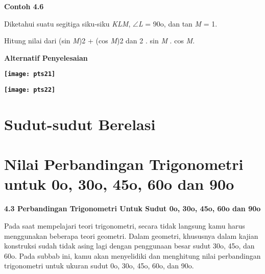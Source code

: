\documentclass[11pt,fleqn]{book} %
\begin{document}
\noindent \textbf{Contoh 4.6}

\noindent \textbf{}

\noindent Diketahui suatu segitiga siku-siku \textit{KLM}, $\mathrm{\angle}$\textit{L }= 90o, dan tan \textit{M }= 1.

\noindent 

\noindent Hitung nilai dari (sin \textit{M})2 + (cos \textit{M})2 dan 2 . sin \textit{M }. cos \textit{M}.

\noindent 

\noindent 

\noindent 

\noindent 

\noindent 

\noindent 

\noindent \textbf{Alternatif Penyelesaian}

\noindent \textbf{}

\noindent \textbf{\texttt{[image: pts21]}}

\noindent \textbf{\texttt{[image: pts22]}}

\noindent \textbf{}
\section{Sudut-sudut Berelasi}

\section{Nilai Perbandingan Trigonometri untuk 0o, 30o, 45o, 60o dan 90o}



\noindent \textbf{4.3 Perbandingan Trigonometri Untuk Sudut 0o, 30o, 45o, 60o dan 90o}

\noindent 

Pada saat mempelajari teori trigonometri, secara tidak langsung kamu harus menggunakan beberapa teori geometri. Dalam geometri, khususnya dalam kajian konstruksi sudah tidak asing lagi dengan penggunaan besar sudut 30o, 45o, dan 60o. Pada subbab ini, kamu akan menyelidiki dan menghitung nilai perbandingan trigonometri untuk ukuran sudut 0o, 30o, 45o, 60o, dan 90o.
\end{document}

